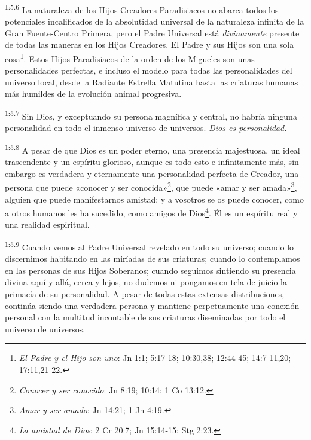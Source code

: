 \par
\textsuperscript{1:5.6} La naturaleza de los Hijos Creadores Paradisiacos no abarca todos los potenciales incalificados de la absolutidad universal de la naturaleza infinita de la Gran Fuente-Centro Primera, pero el Padre Universal está \textit{divinamente} presente de todas las maneras en los Hijos Creadores. El Padre y sus Hijos son una sola cosa\footnote{\textit{El Padre y el Hijo son uno}: Jn 1:1; 5:17-18; 10:30,38; 12:44-45; 14:7-11,20; 17:11,21-22.}. Estos Hijos Paradisiacos de la orden de los Migueles son unas personalidades perfectas, e incluso el modelo para todas las personalidades del universo local, desde la Radiante Estrella Matutina hasta las criaturas humanas más humildes de la evolución animal progresiva.

\par
\textsuperscript{1:5.7} Sin Dios, y exceptuando su persona magnífica y central, no habría ninguna personalidad en todo el inmenso universo de universos. \textit{Dios es personalidad.}

\par
\textsuperscript{1:5.8} A pesar de que Dios es un poder eterno, una presencia majestuosa, un ideal trascendente y un espíritu glorioso, aunque es todo esto e infinitamente más, sin embargo es verdadera y eternamente una personalidad perfecta de Creador, una persona que puede «conocer y ser conocida»\footnote{\textit{Conocer y ser conocido}: Jn 8:19; 10:14; 1 Co 13:12.}, que puede «amar y ser amada»\footnote{\textit{Amar y ser amado}: Jn 14:21; 1 Jn 4:19.}, alguien que puede manifestarnos amistad; y a vosotros se os puede conocer, como a otros humanos les ha sucedido, como amigos de Dios\footnote{\textit{La amistad de Dios}: 2 Cr 20:7; Jn 15:14-15; Stg 2:23.}. Él es un espíritu real y una realidad espiritual.

\par
\textsuperscript{1:5.9} Cuando vemos al Padre Universal revelado en todo su universo; cuando lo discernimos habitando en las miríadas de sus criaturas; cuando lo contemplamos en las personas de sus Hijos Soberanos; cuando seguimos sintiendo su presencia divina aquí y allá, cerca y lejos, no dudemos ni pongamos en tela de juicio la primacía de su personalidad. A pesar de todas estas extensas distribuciones, continúa siendo una verdadera persona y mantiene perpetuamente una conexión personal con la multitud incontable de sus criaturas diseminadas por todo el universo de universos.

